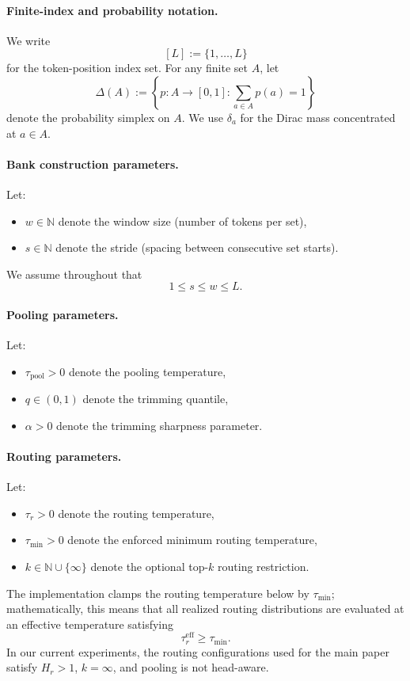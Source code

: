 \documentclass{article}
\theoremstyle{plain}
\theoremstyle{definition}
\theoremstyle{remark}
\begin{document}
\paragraph{Finite-index and probability notation.}
We write
\[
[L]:=\{1,\dots,L\}
\]
for the token-position index set. For any finite set $A$, let
\[
\Delta(A)
:=
\left\{
p:A\to[0,1]:
\sum_{a\in A} p(a)=1
\right\}
\]
denote the probability simplex on $A$. We use $\delta_a$ for the Dirac mass
concentrated at $a\in A$.

\paragraph{Bank construction parameters.}
Let:
\begin{itemize}
    \item $w \in \mathbb{N}$ denote the window size (number of tokens per set),
    \item $s \in \mathbb{N}$ denote the stride (spacing between consecutive set starts).
\end{itemize}
We assume throughout that
\begin{equation}
\label{eq:ws-order}
1 \le s \le w \le L.
\end{equation}

\paragraph{Pooling parameters.}
Let:
\begin{itemize}
    \item $\tau_{\mathrm{pool}} > 0$ denote the pooling temperature,
    \item $q \in (0,1)$ denote the trimming quantile,
    \item $\alpha > 0$ denote the trimming sharpness parameter.
\end{itemize}

\paragraph{Routing parameters.}
Let:
\begin{itemize}
    \item $\tau_r > 0$ denote the routing temperature,
    \item $\tau_{\min} > 0$ denote the enforced minimum routing temperature,
    \item $k \in \mathbb{N} \cup \{\infty\}$ denote the optional top-$k$ routing restriction.
\end{itemize}
The implementation clamps the routing temperature below by $\tau_{\min}$; mathematically, this means that all realized routing distributions are evaluated at an effective temperature satisfying
\begin{equation}
\label{eq:tau-clamp}
\tau_r^{\mathrm{eff}} \ge \tau_{\min}.
\end{equation}
In our current experiments, the routing configurations used for the main paper satisfy $H_r>1$, $k=\infty$, and pooling is not head-aware.
\end{document}
